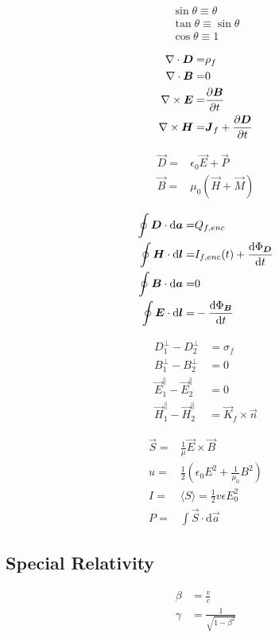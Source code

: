 \begin{align*}
	\sin\theta\equiv\theta\\
	\tan\theta\equiv\sin\theta\\
	\cos\theta\equiv1
\end{align*}

\begin{align*}
    \nabla\cdot\boldsymbol{D} =& \rho_{f} \\
    \nabla\cdot\boldsymbol{B} =& 0 \\
    \nabla \times \boldsymbol{E} =& \frac{\partial \boldsymbol{B}}{\partial t} \\
    \nabla \times \boldsymbol{H} =& \boldsymbol{J}_{f} + \frac{\partial \boldsymbol{D}}{\partial t}
\end{align*}

\begin{align*}
    \vec{D} =& \epsilon_{0}\vec{E} + \vec{P} \\
    \vec{B} =& \mu_{0}(\vec{H} + \vec{M})
\end{align*}

\begin{align*}
    \oint \boldsymbol{D} \cdot \mathrm{d}\boldsymbol{a} =& Q_{f,enc} \\
    \oint \boldsymbol{H} \cdot \mathrm{d}\boldsymbol{l} =& I_{f,enc}(t) + \frac{\mathrm{d} \Phi_{\boldsymbol{D}}}{\mathrm{d} t} \\
    \oint \boldsymbol{B} \cdot \mathrm{d}\boldsymbol{a} =& 0\\
    \oint \boldsymbol{E} \cdot \mathrm{d}\boldsymbol{l} =& - \frac{\mathrm{d} \Phi_{\boldsymbol{B}}}{\mathrm{d} t}
\end{align*}

\begin{align*}
    D_{1}^{\perp} - D_{2}^{\perp} &= \sigma_{f} \\
    B_{1}^{\perp} - B_{2}^{\perp} &= 0 \\
    \vec{E}_{1}^{\parallel} - \vec{E}_{2}^{\parallel} &= 0 \\
    \vec{H}_{1}^{\parallel} - \vec{H}_{2}^{\parallel} &= \vec{K}_f \times \hat{\vec{n}}
\end{align*}

\begin{align*}
    \vec{S} =& \frac{1}{\mu} \vec{E} \times \vec{B} \\
    u =& \frac{1}{2} \left( \epsilon_0 E^{2} + \frac{1}{\mu_0} B^{2} \right) \\
    I =& \langle S \rangle = \frac{1}{2} v\epsilon E_{0}^{2} \\
    P =& \int \vec{S} \cdot \mathrm{d}\vec{a}
\end{align*}

\subsection{Special Relativity}
\begin{align*}
    \beta &= \frac{v}{c} \\
    \gamma &= \frac{1}{\sqrt{1 - \beta^{2}}}
\end{align*}

